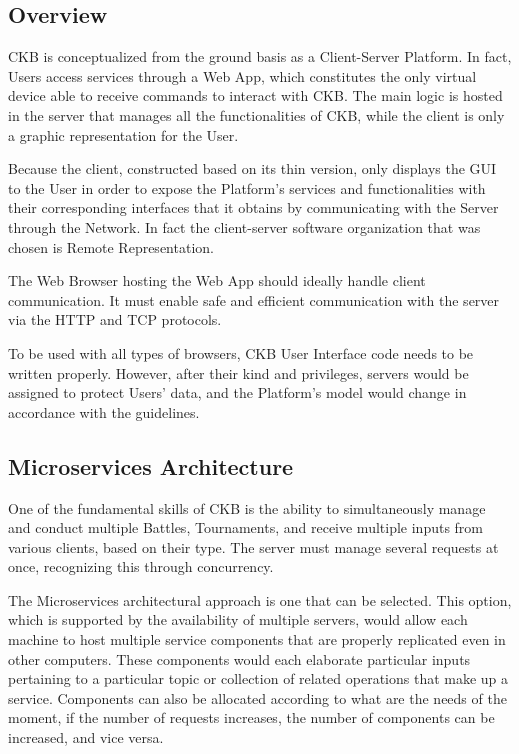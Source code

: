 \subsection{Overview}
CKB is conceptualized from the ground basis as a Client-Server Platform. In fact, Users access services through a Web App, which constitutes the only virtual device able to receive commands to interact 
with CKB.
The main logic is hosted in the server that manages all the functionalities of CKB, while the client is only a graphic representation for the User.

Because the client, constructed based on its thin version, only displays the GUI to the User in order to expose the Platform's services and functionalities with their corresponding interfaces that it obtains by communicating with the Server through 
the Network. In fact the client-server software organization that was chosen is Remote Representation.

The Web Browser hosting the Web App should ideally handle client communication. It must enable safe and efficient communication with the server via the HTTP and TCP protocols. 

To be used with all types of browsers, CKB User Interface code needs to be written properly. However, after their kind and privileges, servers would be assigned to protect Users' data, and the Platform's model would change in accordance 
with the guidelines.

\subsection{Microservices Architecture}
One of the fundamental skills of CKB is the ability to simultaneously manage and conduct multiple Battles, Tournaments, and receive multiple inputs from various clients, based on their type. 
The server must manage several requests at once, recognizing this through concurrency.

The Microservices architectural approach is one that can be selected. 
This option, which is supported by the availability of multiple servers, would allow each machine to host multiple service components that are properly replicated even in other computers. 
These components would each elaborate particular inputs pertaining to a particular topic or collection of related operations that make up a service.
Components can also be allocated according to what are the needs of the moment, if the number of requests increases, the number of components can be increased, and vice versa.

